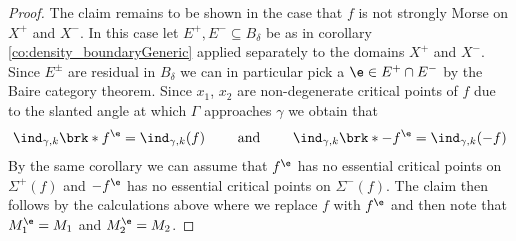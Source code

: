 \begin{proof}
  The claim remains to be shown in the case that $f$ is not strongly Morse on $X^+$ and $X^-$. In this case let
  $E^+,E^-\subseteq B_\delta$ be as in corollary \ref{co:density_boundaryGeneric} applied separately to the domains $X^+$ and $X^-$.
  Since $E^\pm$ are residual in $B_\delta$ we can in particular pick a $\e\in E^+\cap E^-$ by the Baire category theorem.
  Since $x_1$, $x_2$ are non-degenerate critical points of $f$
  due to the slanted angle at which
  $\Gamma$ approaches $\gamma$
  we obtain that
  \begin{align}
    \ind_{\gamma,k}\brk*{f^\e}=\ind_{\gamma,k}(f)\qquad\text{ and }\qquad 
    \ind_{\gamma,k}\brk*{-f^\e}=\ind_{\gamma,k}(-f)
    \label{eq:n3_disproof_morse_indexApprox}
  \end{align}
  By the same corollary we can assume that $f^\e$ has no essential critical points on
  $\Sigma^+(f)$ and $-f^\e$ has no essential critical points on $\Sigma^-(f)$.
  The claim then follows by the calculations above where we replace
  $f$ with $f^\e$ and then note that $M_1^\e=M_1$ and $M_2^\e=M_2$.
\end{proof}


